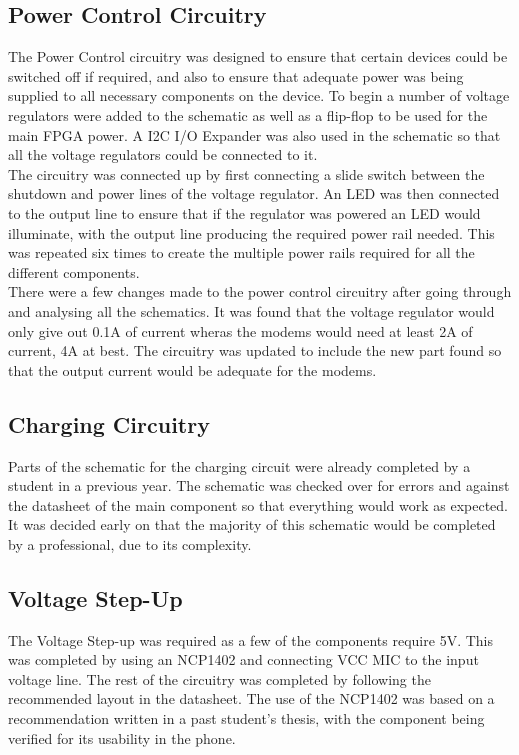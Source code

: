\subsection{Power Control Circuitry}
\label{chap:batt}
	The Power Control circuitry was designed to ensure that certain devices could be switched off if required, and also to ensure that adequate power was being supplied to all necessary components on the device. To begin a number of voltage regulators were added to the schematic as well as a flip-flop to be used for the main FPGA power. A I2C I/O Expander was also used in the schematic so that all the voltage regulators could be connected to it.\\

	The circuitry was connected up by first connecting a slide switch between the shutdown and power lines of the voltage regulator. An LED was then connected to the output line to ensure that if the regulator was powered an LED would illuminate, with the output line producing the required power rail needed. This was repeated six times to create the multiple power rails required for all the different components.\\

	There were a few changes made to the power control circuitry after going through and analysing all the schematics. It was found that the voltage regulator would only give out 0.1A of current wheras the modems would need at least 2A of current, 4A at best. The circuitry was updated to include the new part found so that the output current would be adequate for the modems. 

\subsection{Charging Circuitry}

	Parts of the schematic for the charging circuit were already completed by a student in a previous year. The schematic was checked over for errors and against the datasheet of the main component so that everything would work as expected. It was decided early on that the majority of this schematic would be completed by a professional, due to its complexity.

\subsection{Voltage Step-Up}

	The Voltage Step-up was required as a few of the components require 5V. This was completed by using an NCP1402 and connecting VCC MIC to the input voltage line. The rest of the circuitry was completed by following the recommended layout in the datasheet. The use of the NCP1402 was based on a recommendation written in a past student's thesis, with the component being verified for its usability in the phone. 

